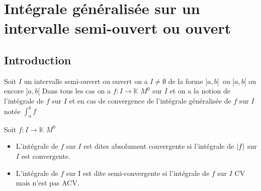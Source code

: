 \documentclass[11pt,hidelinks]{book}
\theoremstyle{mytheoremstyle}
\theoremstyle{mytheoremstyle}
\theoremstyle{mytheoremstyle}
\theoremstyle{mytheoremstyle}
\theoremstyle{mytheoremstyle}
\theoremstyle{mytheoremstyle}
\theoremstyle{mytheoremstyle}
\theoremstyle{mytheoremstyle}
\theoremstyle{myproblemstyle}
\def\mbb#1{\mathbb{#1}}
\def\ib#1{\int_{a}^{b} #1}
\def\bK{\mbb{K}}
\newcommand{\func}[3]{#1\colon#2\to#3}
\begin{document}
    \section{Intégrale généralisée sur un intervalle semi-ouvert ou ouvert}
    \subsection{Introduction} Soit $I$ un intervalle semi-ouvert ou ouvert
    on a $I \not= \emptyset$ de la forme $]a,b]$ ou $[a,b[$ ou encore $]a,b[$
    Dans tous les cas on a $\func{f}{I}{\bK}$ $M^0$ sur $I$ et 
    on a la notion de l'intégrale de $f$ sur $I$ et en cas de convergence de 
    l'intégrale généralisée de $f$ sur $I$ notée $\ib{f}$
    \begin{definition}
        Soit $\func{f}{I}{\bK}$ $M^0$
        \begin{itemize}[label=$\circ$]
        \item L'intégrale de $f$ sur $I$ est dites absolument convergente 
        si l'intégrale de $\abs{f}$ sur $I$ est convergente. 
        \item L'intégrale  de $f$ sur I est dite semi-convergente si l'intégrale 
        de $f$ sur $I$ CV mais n'est pas ACV.
        \end{itemize} 
    \end{definition}
\end{document}
